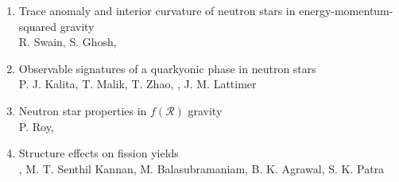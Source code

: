 \begin{enumerate}
\item Trace anomaly and interior curvature of neutron stars in
energy-momentum-squared gravity\\
R. Swain, S. Ghosh, \me\\

\item Observable signatures of a quarkyonic phase in neutron stars\\
P. J. Kalita, T. Malik, T. Zhao, \me, J. M. Lattimer\\

\item Neutron star properties in $f(\mathcal{R})$ gravity\\
P. Roy, \me\\

\item \lead Structure effects on fission yields\\
\me, M. T. Senthil Kannan, M. Balasubramaniam, B. K. Agrawal, S. K. Patra\\
\end{enumerate}
